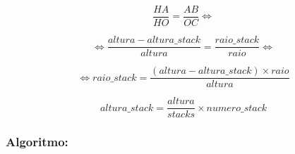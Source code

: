 \documentclass[a4paper]{article}
\begin{document}
\ttfamily
$$ \frac{HA}{HO} = \frac{AB}{OC} \Leftrightarrow $$

\vspace{0.5cm}

$$ \Leftrightarrow \frac{altura - altura\_stack}{altura} = \frac{raio\_stack}{raio} \Leftrightarrow $$

\vspace{0.5cm}

$$ \Leftrightarrow raio\_stack = \frac{(altura - altura\_stack) \times raio}{altura} $$

\vspace{1cm}

$$ altura\_stack = \frac{altura}{stacks} \times numero\_stack $$

\newpage

\subsubsection{Algoritmo:}
\end{document}
